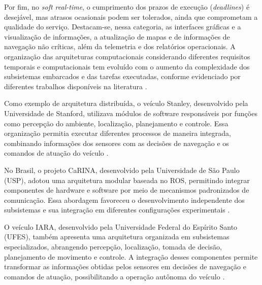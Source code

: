 Por fim, no \textit{soft real-time}, o cumprimento dos prazos de execução (\textit{deadlines}) é desejável, mas atrasos ocasionais podem ser tolerados, ainda que comprometam a qualidade do serviço. Destacam-se, nessa categoria, as interfaces gráficas e a visualização de informações, a atualização de mapas e de informações de navegação não críticas, além da telemetria e dos relatórios operacionais. A organização das arquiteturas computacionais considerando diferentes requisitos temporais e computacionais tem evoluído com o aumento da complexidade dos subsistemas embarcados e das tarefas executadas, conforme evidenciado por diferentes trabalhos disponíveis na literatura \citep{Kato2018,Hong2024,Bonci2026}.

Como exemplo de arquitetura distribuída, o veículo Stanley, desenvolvido pela Universidade de Stanford, utilizava módulos de software responsáveis por funções como percepção do ambiente, localização, planejamento e controle. Essa organização permitia executar diferentes processos de maneira integrada, combinando informações dos sensores com as decisões de navegação e os comandos de atuação do veículo \citep{Thrun2006}.

No Brasil, o projeto CaRINA, desenvolvido pela Universidade de São Paulo (USP), adotou uma arquitetura modular baseada no ROS, permitindo integrar componentes de hardware e software por meio de mecanismos padronizados de comunicação. Essa abordagem favoreceu o desenvolvimento independente dos subsistemas e sua integração em diferentes configurações experimentais \citep{Fernandes2014}.

O veículo IARA, desenvolvido pela Universidade Federal do Espírito Santo (UFES), também apresenta uma arquitetura organizada em subsistemas especializados, abrangendo percepção, localização, tomada de decisão, planejamento de movimento e controle. A integração desses componentes permite transformar as informações obtidas pelos sensores em decisões de navegação e comandos de atuação, possibilitando a operação autônoma do veículo \citep{Badue2021}.